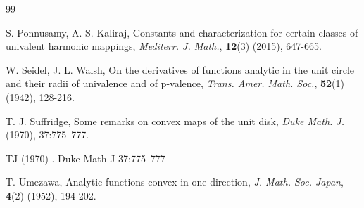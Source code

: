 \documentclass[a4paper,12pt]{amsart}
\theoremstyle{definition}
\begin{document}
\begin{thebibliography}{99}
		
		{\sc S. Ponnusamy, A. S. Kaliraj}, Constants and characterization for certain classes of univalent harmonic mappings, {\it Mediterr. J. Math.}, {\bf 12}(3) (2015), 647-665.
		
		
		
		
		
		{\sc W. Seidel, J. L. Walsh}, On the derivatives of functions analytic in the unit circle and their radii of univalence and of p-valence, {\it Trans. Amer. Math. Soc.}, {\bf 52}(1) (1942), 128-216.

{\sc T. J. Suffridge}, Some remarks on convex maps of the unit disk, {\it Duke Math. J.} (1970), 37:775–777.

 TJ (1970) . Duke Math J 37:775–777

		
%		
%		
%		
		
		
		{\sc T. Umezawa}, Analytic functions convex in one direction, \textit{J. Math. Soc. Japan}, {\bf 4}(2) (1952),  194-202.
		
		
		
		
		
		
		

\end{thebibliography}
\end{document}
